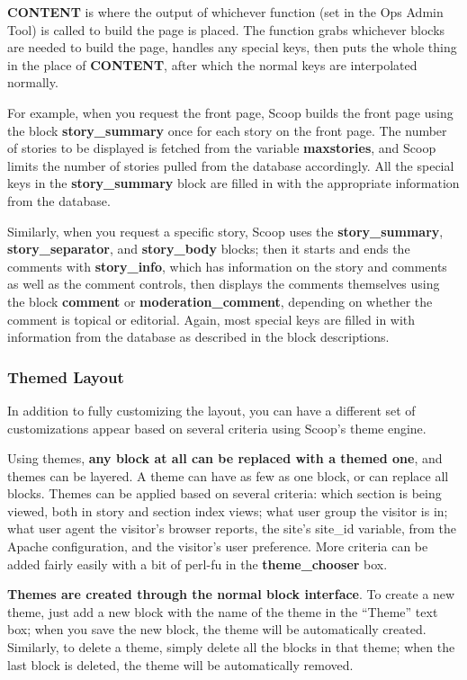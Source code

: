 {\bf CONTENT} is where the output of whichever function (set in the Ops Admin Tool) is called to build the page is placed.  The function grabs whichever blocks are needed to build the page, handles any special keys, then puts the whole thing in the place of {\bf \latexhtml{$\vert$}{|}CONTENT\latexhtml{$\vert$}{|}}, after which the normal keys are interpolated normally.

For example, when you request the front page, Scoop builds the front page using the block {\bf story\_summary} once for each story on the front page.  The number of stories to be displayed is fetched from the variable {\bf maxstories}, and Scoop limits the number of stories pulled from the database accordingly.  All the special keys in the {\bf story\_summary} block are filled in with the appropriate information from the database.

Similarly, when you request a specific story, Scoop uses the {\bf story\_summary}, {\bf story\_separator}, and {\bf story\_body} blocks; then it starts and ends the comments with {\bf story\_info}, which has information on the story and comments as well as the comment controls, then displays the comments themselves using the block {\bf comment} or {\bf moderation\_comment}, depending on whether the comment is topical or editorial.  Again, most special keys are filled in with information from the database as described in the block descriptions.

\subsubsection{Themed Layout}
\label{blocks-themes}

In addition to fully customizing the layout, you can have a different set of customizations appear based on several criteria using Scoop's theme engine.

Using themes, {\bf any block at all can be replaced with a themed one}, and themes can be layered.  A theme can have as few as one block, or can replace all blocks.  Themes can be applied based on several criteria: which section is being viewed, both in story and section index views; what user group the visitor is in; what user agent the visitor's browser reports, the site's site\_id variable, from the Apache configuration, and the visitor's user preference.  More criteria can be added fairly easily with a bit of perl-fu in the {\bf theme\_chooser} box.

{\bf Themes are created through the normal block interface}.  To create a new theme, just add a new block with the name of the theme in the ``Theme'' text box; when you save the new block, the theme will be automatically created.  Similarly, to delete a theme, simply delete all the blocks in that theme; when the last block is deleted, the theme will be automatically removed.

